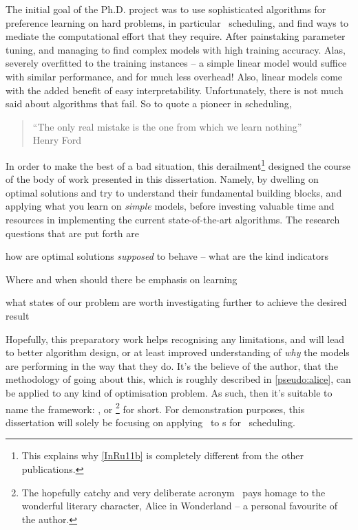 The initial goal of the Ph.D. project was to use sophisticated algorithms for 
preference learning on hard problems, in particular \jsp\ scheduling, and find 
ways to mediate the computational effort that they require.
After painstaking parameter tuning, and managing to find complex models 
with high training accuracy. Alas, severely overfitted to the training 
instances -- a simple linear model would suffice with similar performance, and 
for much less overhead! Also, linear models come with the added benefit of easy 
interpretability. 
Unfortunately, there is not much said about algorithms that fail. 
So to quote a pioneer in scheduling, 
\begin{quote}
    ``The only real mistake is the one from which we learn nothing'' \\
    \raggedleft Henry Ford
\end{quote}
In order to make the best of a bad situation, this derailment\footnote{
    This explains why \cref{InRu11b} is completely different from the other 
    publications.} 
designed the course of the body of work presented in this dissertation. 
Namely, by dwelling on optimal solutions and try to understand 
their fundamental building blocks, and applying what you learn on \emph{simple} 
models, before investing valuable time and resources in implementing the 
current state-of-the-art algorithms. 
The research questions that are put forth are
\begin{enumerate*}[itemjoin={{? }}, itemjoin*={{? And ultimately, }},
    after={{?}}]
    \item how are optimal solutions \emph{supposed} to behave -- what are the 
    kind indicators
    \item Where and when should there be emphasis on learning
    \item what states of our problem are worth investigating further to achieve 
    the desired result
\end{enumerate*}

Hopefully, this preparatory work helps recognising any limitations, and will 
lead to better algorithm design, or at least improved understanding of 
\emph{why} the models are performing in the way that they do.
It's the believe of the author, that the methodology of going about this, which 
is roughly described in \cref{pseudo:alice}, can be applied to any kind of 
optimisation problem. As such, then it's suitable to name the framework:
\emph{\fullnameAlice}, or \Alice\footnote{
    The hopefully catchy and very deliberate acronym \Alice\ pays homage to the 
    wonderful literary character, Alice in Wonderland -- a personal favourite 
    of the author.} 
for short. 
For demonstration purposes, this dissertation will solely be 
focusing on applying \Alice\ to \dr s for \jsp\ scheduling.

